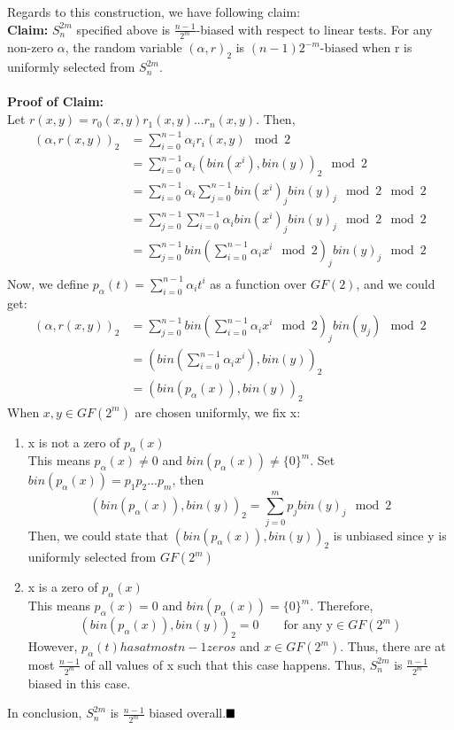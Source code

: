 \documentclass[a4paper, english]{paper}
\begin{document}
 Regards to this construction, we have following claim:\\
\noindent\textbf{Claim:} $S^{2m}_n$ specified above is $\frac{n-1}{2^m}$-biased with respect to linear tests. For any non-zero $\alpha$, the random variable $(\alpha,r)_2$ is $(n-1)2^{-m}$-biased when r is uniformly selected from $S^{2m}_n$.\\\\
\noindent\textbf{Proof of Claim:}\\
Let $r(x,y)=r_0(x,y)r_1(x,y)...r_n(x,y)$. Then, 
\begin{align*}
(\alpha,r(x,y))_2 &= \sum_{i=0}^{n-1}\alpha_ir_i(x,y) \mod 2\\
&= \sum_{i=0}^{n-1}\alpha_i(bin(x^i),bin(y))_2 \mod 2\\
&= \sum_{i=0}^{n-1}\alpha_i \sum_{j=0}^{n-1}bin(x^i)_jbin(y)_j \mod2 \mod 2\\
&= \sum_{j=0}^{n-1}\sum_{i=0}^{n-1}\alpha_i bin(x^i)_jbin(y)_j \mod2 \mod 2\\
&= \sum_{j=0}^{n-1}bin\left(\sum_{i=0}^{n-1}\alpha_i x^i \mod2 \right)_jbin(y)_j \mod 2\\
\end{align*}
Now, we define $p_\alpha(t) = \sum_{i=0}^{n-1}\alpha_i t^i$ as a function over $GF(2)$, and we could get:
\begin{align*}
(\alpha,r(x,y))_2 
&= \sum_{j=0}^{n-1}bin\left(\sum_{i=0}^{n-1}\alpha_i x^i \mod2 \right)_jbin(y_j) \mod 2\\
&= (bin(\sum_{i=0}^{n-1}\alpha_i x^i),bin(y))_2\\
&= (bin(p_\alpha(x)), bin(y))_2
\end{align*}
When $x,y\in GF(2^m)$ are chosen uniformly, we fix x:
\begin{enumerate}
\item x is not a zero of $p_\alpha(x)$\\
This means $p_\alpha(x)\ne 0$ and $bin(p_\alpha(x))\ne\{0\}^m$. Set $bin(p_\alpha(x))=p_1p_2...p_{m}$, then 
$$(bin(p_\alpha(x)), bin(y))_2 = \sum_{j=0}^m p_jbin(y)_j \mod 2$$
Then, we could state that $(bin(p_\alpha(x)), bin(y))_2$ is unbiased since y is uniformly selected from $GF(2^m)$
\item x is a zero of $p_\alpha(x)$\\
This means $p_\alpha(x)= 0$ and $bin(p_\alpha(x))=\{0\}^m$. Therefore,$$(bin(p_\alpha(x)), bin(y))_2 = 0 \qquad\text{for any y}\in GF(2^m)$$
However, $p_\alpha(t)has at most n-1 zeros$ and $x\in GF(2^m)$. Thus, there are at most $\frac{n-1}{2^m}$ of all values of x such that this case happens. Thus, $S^{2m}_n$ is $\frac{n-1}{2^m}$ biased in this case.
\end{enumerate}
In conclusion, $S^{2m}_n$ is $\frac{n-1}{2^m}$ biased overall.$\hfill\blacksquare$ \\
\end{document}
